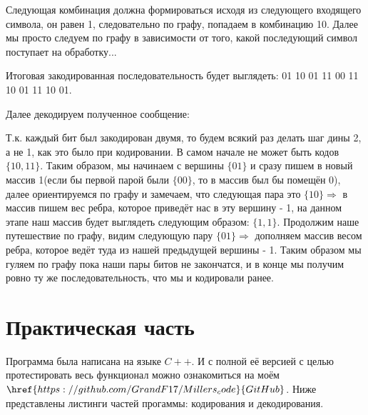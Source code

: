 \documentclass[utf8,14pt,a4paper,oneside,russian]{book}
\begin{document}
	Следующая комбинация должна формироваться исходя из следующего входящего символа, он равен 1, следовательно по графу, попадаем в комбинацию 10. Далее мы просто следуем по графу в зависимости от того, какой последующий символ поступает на обработку...
	
	Итоговая закодированная последовательность будет выглядеть: 01 10 01 11 00 11 10 01 11 10 01.
	
	Далее декодируем полученное сообщение:
	
	Т.к. каждый бит был закодирован двумя, то будем всякий раз делать шаг дины 2, а не 1, как это было при кодировании. В самом начале не может быть кодов $\{10, 11\}$. Таким образом, мы начинаем с вершины $\{01\}$ и сразу пишем в новый массив 1(если бы первой парой были $\{00\}$, то в массив был бы помещён 0), далее ориентируемся по графу и замечаем, что следующая пара это $\{10\}\Rightarrow$ в массив пишем вес ребра, которое приведёт нас в эту вершину - 1, на данном этапе наш массив будет выглядеть следующим образом: $\{1,1\}$. Продолжим наше путешествие по графу, видим следующую пару $\{01\}\Rightarrow$ дополняем массив весом ребра, которое ведёт туда из нашей предыдущей вершины - 1. Таким образом мы гуляем по графу пока наши пары битов не закончатся, и в конце мы получим ровно ту же последовательность, что мы и кодировали ранее.
	
	\newpage
	\section{Практическая часть}
	
	Программа была написана на языке $C++$. И с полной её версией с целью протестировать весь функционал можно ознакомиться на моём $\href{https://github.com/GrandF17/Millers_code}{GitHub}$. Ниже представлены листинги частей прогаммы: кодирования и декодирования.
	
\end{document}
